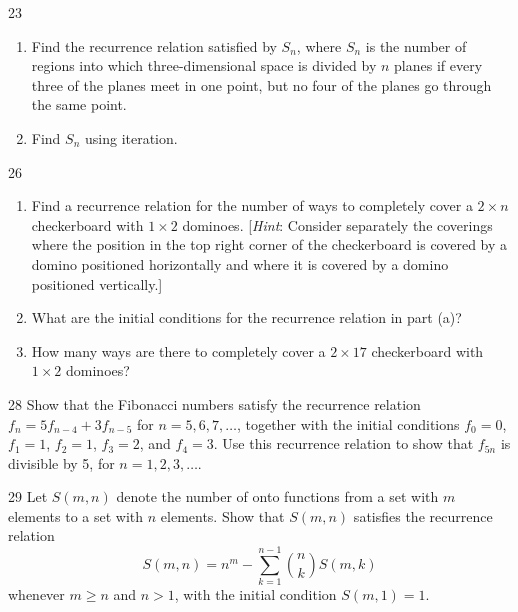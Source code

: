 \documentclass[11pt]{article}
\begin{document}
\begin{exercise}{23}
    \begin{enumerate}[label=(\alph*)]
        \item Find the recurrence relation satisfied by $S_n$, where
        $S_n$ is the number of regions into which three-dimensional
        space is divided by $n$ planes if every three of the planes
        meet in one point, but no four of the planes go through the
        same point.
        \item Find $S_n$ using iteration.
    \end{enumerate}
\end{exercise}

\begin{exercise}{26}
    \begin{enumerate}[label=(\alph*)]
        \item Find a recurrence relation for the number of ways to
        completely cover a $2 \times n$ checkerboard with
        $1 \times 2$ dominoes.
        [\emph{Hint}: Consider separately the coverings where the
        position in the top right corner of the checkerboard is
        covered by a domino positioned horizontally and where it is
        covered by a domino positioned vertically.]
        \item What are the initial conditions for the recurrence
        relation in part (a)?
        \item How many ways are there to completely cover a
        $2 \times 17$ checkerboard with $1 \times 2$ dominoes?
    \end{enumerate}
\end{exercise}

\begin{exercise}{28}
    Show that the Fibonacci numbers satisfy the recurrence relation
    $f_n = 5f_{n-4} + 3f_{n-5}$ for $n = 5, 6, 7, \dots$, together with
    the initial conditions $f_0 = 0$, $f_1 = 1$, $f_2 = 1$, $f_3 = 2$,
    and $f_4 = 3$. Use this recurrence relation to show that $f_{5n}$
    is divisible by 5, for $n = 1, 2, 3, \dots$.
\end{exercise}

\begin{exercise}{29}
    Let $S(m,n)$ denote the number of onto functions from a set with
    $m$ elements to a set with $n$ elements. Show that $S(m,n)$
    satisfies the recurrence relation
    \[
    S(m,n) = n^m - \sum_{k=1}^{n-1} \binom{n}{k} S(m,k)
    \]
    whenever $m \geq n$ and $n > 1$, with the initial condition
    $S(m,1) = 1$.
\end{exercise}
\end{document}
